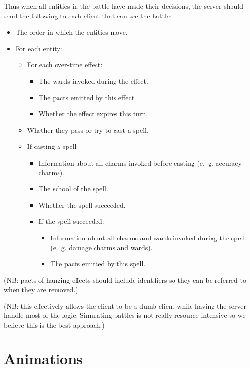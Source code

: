 \documentclass{article}
\begin{document}
Thus when all entities in the battle have made their decisions, the server should send the following to each client that can see the battle:

\begin{itemize}
  \item The order in which the entities move.
  \item For each entity:
  \begin{itemize}
    \item For each over-time effect:
    \begin{itemize}
      \item The wards invoked during the effect.
      \item The pacts emitted by this effect.
      \item Whether the effect expires this turn.
    \end{itemize}
    \item Whether they pass or try to cast a spell.
    \item If casting a spell:
    \begin{itemize}
      \item Information about all charms invoked before casting (e.~g. accuracy charms).
      \item The school of the spell.
      \item Whether the spell succeeded.
      \item If the spell succeeded:
      \begin{itemize}
        \item Information about all charms and wards invoked during the spell (e.~g. damage charms and wards).
        \item The pacts emitted by this spell.
      \end{itemize}
    \end{itemize}
  \end{itemize}
\end{itemize}

(NB: pacts of hanging effects should include identifiers so they can be referred to when they are removed.)

(NB: this effectively allows the client to be a dumb client while having the server handle most of the logic. Simulating battles is not really resource-intensive so we believe this is the best approach.)

\section{Animations}
\end{document}
